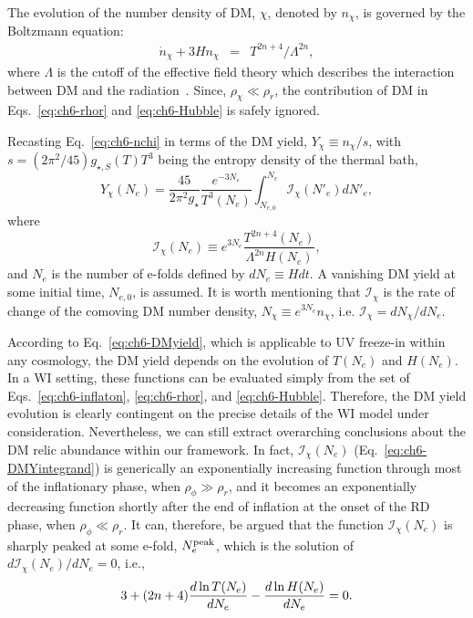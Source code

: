 The evolution of the number density of DM, $\chi$, denoted by $n_\chi$, is governed by the Boltzmann equation:
\begin{eqnarray}
    \dot{n}_\chi+3H n_\chi&=&T^{2n+4}/\Lambda^{2n},\label{eq:ch6-nchi}
\end{eqnarray}
where $\Lambda$ is the cutoff of the effective field theory which describes the interaction between DM and the radiation~\cite{Elahi:2014fsa}. Since, $\rho_\chi\ll \rho_r$, the contribution of DM in Eqs.~\eqref{eq:ch6-rhor} and \eqref{eq:ch6-Hubble} is safely ignored.

Recasting Eq.~\eqref{eq:ch6-nchi} in terms of the DM yield, $Y_\chi\equiv n_\chi / s$, with $s=(2\pi^2/45)g_{\star, S}(T)T^3$ being the entropy density of the thermal bath,
\begin{equation}
 Y_\chi(N_e)=\frac{45}{2\pi^2g_\star}\frac{e^{-3N_e}}{ T^3(N_e)}\int_{N_{e, 0}}^{N_e}\mathcal{I}_\chi(N'_e) dN'_e,
 \label{eq:ch6-DMyield}
\end{equation}
where
\begin{equation}
    \mathcal{I}_\chi(N_e)\equiv e^{3N_e}\frac{T^{2n+4}(N_e)}{\Lambda^{2n}H(N_e)}, \label{eq:ch6-DMYintegrand}
\end{equation}
and $N_e$ is the number of e-folds defined by $dN_e\equiv Hdt$. A vanishing DM yield at some initial time, $N_{e, 0}$, is assumed.
It is worth mentioning that $\mathcal{I}_\chi$ is the rate of change of the comoving DM number density, $N_\chi\equiv e^{3N_e}n_\chi$, i.e.  $\mathcal{I}_\chi= dN_\chi/dN_e$.

According to Eq.~\eqref{eq:ch6-DMyield}, which is applicable to UV freeze-in within any cosmology, the DM yield depends on the evolution of $T(N_e)$ and $H(N_e)$. In a WI setting, these functions can be evaluated simply from the set of Eqs.~\eqref{eq:ch6-inflaton}, \eqref{eq:ch6-rhor}, and \eqref{eq:ch6-Hubble}. Therefore, the DM yield evolution is clearly contingent on the precise details of the WI model under consideration.
Nevertheless, we can still extract overarching conclusions about the DM relic abundance within our framework. In fact, $\mathcal{I}_\chi(N_e)$ (Eq.~\eqref{eq:ch6-DMYintegrand}) is generically an exponentially increasing function through most of the inflationary phase, when $\rho_\phi\gg \rho_r$, and it becomes an exponentially decreasing function shortly after the end of inflation at the onset of the RD phase, when $\rho_\phi\ll \rho_r$. It can, therefore, be argued that the function $\mathcal{I}_\chi(N_e)$
is sharply peaked at some e-fold, $N_{e}^{\rm{peak}}$, which is the solution of  $d \mathcal{I}_\chi(N_e) / dN_e = 0$, i.e.,
\begin{equation}
 3+(2n+4)\frac{d\,{\rm ln}\,T(N_e)}{dN_e}-\frac{d\,{\rm ln}\,H(N_e)}{dN_e}=0.
 \label{eq:ch6-Nemax}
\end{equation}


